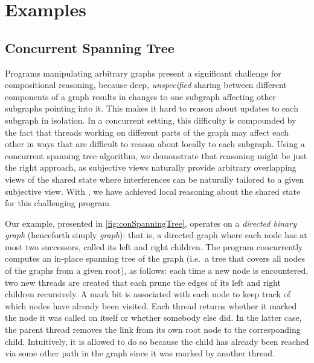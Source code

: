 \section{Examples}\label{sec:examples}


\subsection{Concurrent Spanning Tree}\label{subsec:CST-example}

Programs manipulating arbitrary graphs present a
significant challenge for compositional reasoning, because deep,
\emph{unspecified} sharing between different components of a graph
results in 
changes to one subgraph affecting other subgraphs pointing 
into it. This makes it hard to reason about updates to each subgraph
in isolation. In a concurrent setting, this difficulty is compounded
by 
the fact that threads working on different parts of the graph may
affect each other in ways that are difficult to reason about locally
to each subgraph. Using  a concurrent spanning tree
algorithm, we demonstrate  that \colosl reasoning might be just the right approach, 
as subjective views 
naturally provide  arbitrary overlapping views of the shared state
where interferences can be naturally tailored to 
a given subjective view. With \colosl, we have 
achieved  local reasoning about the shared state for this challenging program.

Our example, presented in \fig\ref{fig:conSpanningTree}, operates on a
\emph{directed binary graph} (henceforth simply \emph{graph}): 
that is,  a directed graph where each node has at most two
successors, called its left and right children. The program concurrently computes an
in-place spanning tree of the graph (i.e.\ a tree that covers
all nodes of the graphs from a given root), as follows:
each time a new node is encountered, two new threads are created that
each prune the edges of its left and right children recursively. A
mark bit is associated with each node to keep track of which nodes  have
already been visited. Each thread returns whether it marked the node
it was called on itself or whether somebody else did. In the latter case,
the parent thread removes the link from its own root node to the
corresponding child. Intuitively, it is allowed to do so because the
child has already been  reached via some other path in the graph since it was marked by another thread.


